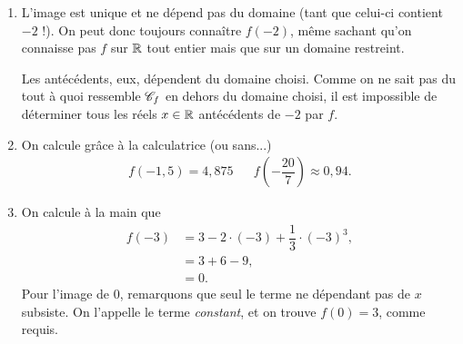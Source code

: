 {\begin{enumerate}
			\item L'image est unique et ne dépend pas du domaine (tant que celui-ci contient $-2$ !).
			On peut donc toujours connaître $f(-2)$, même sachant qu'on connaisse pas $f$ sur $\mathbb{R}$ tout entier mais que sur un domaine restreint.
			
			Les antécédents, eux, dépendent du domaine choisi.
			Comme on ne sait pas du tout à quoi ressemble $\mathcal{C}_f$ en dehors du domaine choisi, il est impossible de déterminer tous les réels $x\in\mathbb{R}$ antécédents de $-2$ par $f$.
			
			\item On calcule grâce à la calculatrice (ou sans...)
				\begin{align*}
					f(-1,5) = 4,875 && f\left(-\dfrac{20}7 \right) \approx 0,94.
				\end{align*}
			\item On calcule à la main que
				\begin{align*}
					f(-3) &= 3 - 2 \cdot (-3) + \dfrac13 \cdot (-3)^3, \\
						&= 3 + 6 - 9, \\
						&= 0.
				\end{align*}
			Pour l'image de $0$, remarquons que seul le terme ne dépendant pas de $x$ subsiste. 
			On l'appelle le terme \emph{constant}, et on trouve $f(0) = 3$, comme requis.
		\end{enumerate}
	
	
	}
	
	
